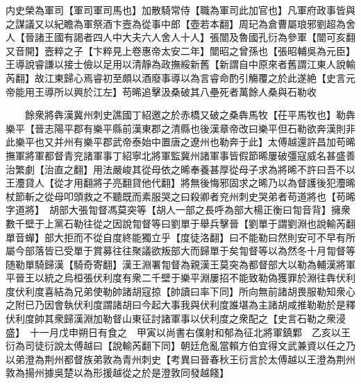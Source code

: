 内史榮為軍司【軍司軍司馬也】加散騎常侍【職為軍司此加官也】凡軍府政事皆與之謀議又以紀瞻為軍祭酒卞壼為從事中郎【壺若本翻】周玘為倉曹屬琅邪劉超為舍人【晉諸王國有謁者四人中大夫六人舍人十人】張闓及魯國孔衍為參軍【闓可亥翻又音開】壼粹之子【卞粹見上卷惠帝太安二年】闓昭之曾孫也【張昭輔吳為元臣】王導說睿謙以接士儉以足用以清靜為政撫綏新舊【新謂自中原來者舊謂江東人說輸芮翻】故江東歸心焉睿初至頗以酒廢事導以為言睿命酌引觴覆之於此遂絶【史言元帝能用王導所以興於江左】苟晞追擊汲桑破其八壘死者萬餘人桑與石勒收

　　餘衆將犇漢冀州刺史譙國丁紹邀之於赤橋又破之桑犇馬牧【茌平馬牧也】勒犇樂平【晉志陽平郡有樂平縣前漢東郡之清縣也後漢章帝改曰樂平但石勒欲奔漢則非此樂平也又并州有樂平郡武帝泰始中置唐之遼州也勒奔于此】太傅越還許昌加苟晞撫軍將軍都督青兖諸軍事丁紹寧北將軍監冀州諸軍事皆假節晞屢破彊寇威名甚盛善治繁劇【治直之翻】用法嚴峻其從母依之晞奉養甚厚從母子求為將晞不許曰吾不以王灋貸人【從才用翻將子亮翻貸他代翻】將無後悔邪固求之晞乃以為督護後犯灋晞杖節斬之從母叩頭救之不聽既而素服哭之曰殺卿者兖州刺史哭弟者苟道將也【苟晞字道將】　胡部大張㔨督馮莫突等【胡人一部之長呼為部大楊正衡曰㔨音背】擁衆數千壁于上黨石勒往從之因說㔨督等曰劉單于舉兵擊晉【劉單于謂劉淵也說輸芮翻單音蟬】部大拒而不從自度終能獨立乎【度徒洛翻】曰不能勒曰然則安可不早有所屬今部落皆已受單于賞募往往聚議欲叛部大而歸單于矣㔨督等以為然冬十月㔨督等随勒單騎歸漢【騎奇寄翻】漢王淵署㔨督為親漢王莫突為都督部大以勒為輔漢將軍平晉王以統之烏桓張伏利度有衆二千壁于樂平淵屢招不能致勒偽獲罪於淵往犇伏利度伏利度喜結為兄弟使勒帥諸胡寇掠【帥讀曰率下同】所向無前諸胡畏服勒知衆心之附已乃因會執伏利度謂諸胡曰今起大事我與伏利度誰堪為主諸胡咸推勒勒於是釋伏利度帥其衆歸漢淵加勒督山東征討諸軍事以伏利度之衆配之【史言石勒之衆浸盛】　十一月戊申朔日有食之　甲寅以尚書右僕射和郁為征北將軍鎮鄴　乙亥以王衍為司徒衍說太傅越曰【說輸芮翻下同】朝廷危亂當賴方伯宜得文武兼資以任之乃以弟澄為荆州都督族弟敦為青州刺史【考異曰晉春秋王衍言於太傅越以王澄為荆州敦為揚州據吳楚以為形援越從之於是澄敦同發越餞】

